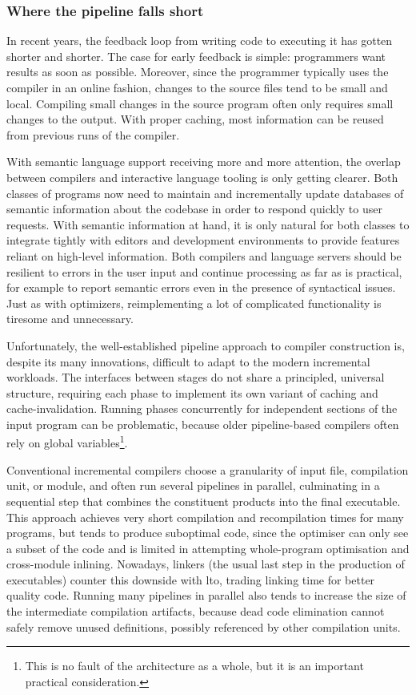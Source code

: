 \subsubsection*{Where the pipeline falls short}

In recent years, the feedback loop from writing code to executing it has gotten
shorter and shorter. The case for early feedback is simple: programmers want
results as soon as possible. Moreover, since the programmer typically uses the
compiler in an online fashion, changes to the source files tend to be small and
local. Compiling small changes in the source program often only requires small
changes to the output. With proper caching, most information can be reused from
previous runs of the compiler.

With semantic language support receiving more and more attention, the overlap
between compilers and interactive language tooling is only getting clearer. Both
classes of programs now need to maintain and incrementally update databases of
semantic information about the codebase in order to respond quickly to user
requests. With semantic information at hand, it is only natural for both classes
to integrate tightly with editors and development environments to provide
features reliant on high-level information. Both compilers and language servers
should be resilient to errors in the user input and continue processing as far
as is practical, for example to report semantic errors even in the presence of
syntactical issues. Just as with optimizers, reimplementing a lot of complicated
functionality is tiresome and unnecessary.

Unfortunately, the well-established pipeline approach to compiler construction
is, despite its many innovations, difficult to adapt to the modern incremental
workloads. The interfaces between stages do not share a principled, universal
structure, requiring each phase to implement its own variant of caching and
cache-invalidation. Running phases concurrently for independent sections of the
input program can be problematic, because older pipeline-based compilers often
rely on global variables\footnote{This is no fault of the architecture as a
whole, but it is an important practical consideration.}.

Conventional incremental compilers choose a granularity of input file,
compilation unit, or module, and often run several pipelines in parallel,
culminating in a sequential step that combines the constituent products into the
final executable. This approach achieves very short compilation and
recompilation times for many programs, but tends to produce suboptimal code,
since the optimiser can only see a subset of the code and is limited in
attempting whole-program optimisation and cross-module inlining. Nowadays,
linkers (the usual last step in the production of executables) counter this
downside with \acrfull{lto}, trading linking time for better quality code.
Running many pipelines in parallel also tends to increase the size of the
intermediate compilation artifacts, because dead code elimination cannot safely
remove unused definitions, possibly referenced by other compilation units.

